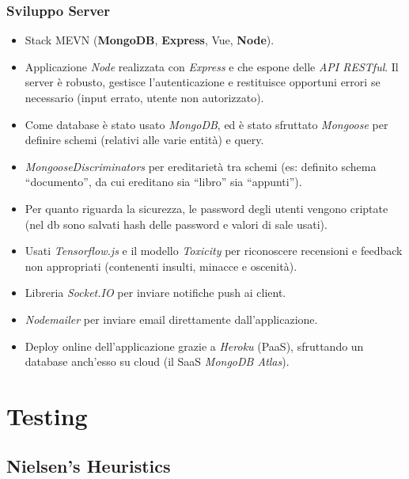 \documentclass{beamer}
\begin{document}
\begin{frame}
\frametitle{Sviluppo Server}
\begin{itemize}
\item Stack MEVN (\textbf{MongoDB}, \textbf{Express}, Vue, \textbf{Node}).
\item Applicazione \textit{Node} realizzata con \textit{Express} e che espone delle \textit{API RESTful}. Il server è robusto, gestisce l'autenticazione e restituisce opportuni errori se necessario (input errato, utente non autorizzato).
\item Come database è stato usato \textit{MongoDB}, ed è stato sfruttato \textit{Mongoose} per definire schemi (relativi alle varie entità) e query.
\item \textit{MongooseDiscriminators} per ereditarietà tra schemi (es: definito schema ``documento'', da cui ereditano sia ``libro'' sia ``appunti'').
\item Per quanto riguarda la sicurezza, le password degli utenti vengono criptate (nel db sono salvati hash delle password e valori di sale usati). 
\item Usati \textit{Tensorflow.js} e il modello \textit{Toxicity} per riconoscere recensioni e feedback non appropriati (contenenti insulti, minacce e oscenità).
\item Libreria \textit{Socket.IO} per inviare notifiche push ai client.
\item \textit{Nodemailer} per inviare email direttamente dall'applicazione.
\item Deploy online dell'applicazione grazie a \textit{Heroku} (PaaS), sfruttando un database anch'esso su cloud (il SaaS \textit{MongoDB Atlas}).
\end{itemize}
\end{frame}

\section{Testing}

\subsection{Nielsen’s Heuristics}
\end{document}
